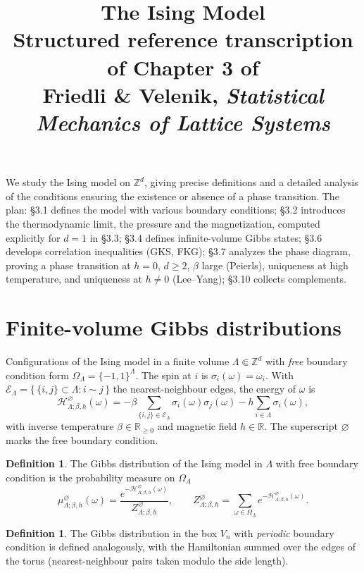 \documentclass[11pt]{article}
\title{\textbf{The Ising Model}\\[4pt]
\large Structured reference transcription of Chapter 3 of\\
Friedli \& Velenik, \emph{Statistical Mechanics of Lattice Systems}}
\author{}
\date{}
\theoremstyle{plain}
\theoremstyle{definition}
\newtheorem{definition}[theorem]{Definition}
\theoremstyle{remark}
\newcommand{\Z}{\mathbb{Z}}
\newcommand{\R}{\mathbb{R}}
\newcommand{\Rgeq}{\R_{\ge 0}}
\newcommand{\fin}{\Subset}          %
\newcommand{\La}{\Lambda}
\newcommand{\sg}{\sigma}
\newcommand{\Ham}{\mathcal{H}}
\newcommand{\Eset}{\mathscr{E}}
\begin{document}
\maketitle

\noindent
We study the Ising model on $\Z^d$, giving precise definitions and a detailed
analysis of the conditions ensuring the existence or absence of a phase
transition. The plan: \S3.1 defines the model with various boundary conditions;
\S3.2 introduces the thermodynamic limit, the pressure and the magnetization,
computed explicitly for $d=1$ in \S3.3; \S3.4 defines infinite-volume Gibbs
states; \S3.6 develops correlation inequalities (GKS, FKG); \S3.7 analyzes the
phase diagram, proving a phase transition at $h=0$, $d\ge 2$, $\beta$ large
(Peierls), uniqueness at high temperature, and uniqueness at $h\neq0$
(Lee--Yang); \S3.10 collects complements.

\section{Finite-volume Gibbs distributions}
Configurations of the Ising model in a finite volume $\La \fin \Z^d$ with
\emph{free} boundary condition form $\Omega_\La = \{-1,1\}^\La$. The spin at
$i$ is $\sg_i(\omega)=\omega_i$. With $\Eset_\La = \{\,\{i,j\}\subset\La : i\sim
j\,\}$ the nearest-neighbour edges, the energy of $\omega$ is
\[
  \Ham^{\varnothing}_{\La;\beta,h}(\omega)
    = -\beta \sum_{\{i,j\}\in\Eset_\La} \sg_i(\omega)\sg_j(\omega)
      - h \sum_{i\in\La} \sg_i(\omega),
\]
with inverse temperature $\beta\in\Rgeq$ and magnetic field $h\in\R$. The
superscript $\varnothing$ marks the free boundary condition.

\begin{definition}
The Gibbs distribution of the Ising model in $\La$ with free boundary condition
is the probability measure on $\Omega_\La$
\[
  \mu^{\varnothing}_{\La;\beta,h}(\omega)
    = \frac{e^{-\Ham^{\varnothing}_{\La;\beta,h}(\omega)}}
           {Z^{\varnothing}_{\La;\beta,h}},
  \qquad
  Z^{\varnothing}_{\La;\beta,h}
    = \sum_{\omega\in\Omega_\La} e^{-\Ham^{\varnothing}_{\La;\beta,h}(\omega)} .
\]
\end{definition}

\begin{definition}
The Gibbs distribution in the box $V_n$ with \emph{periodic} boundary condition
is defined analogously, with the Hamiltonian summed over the edges of the torus
(nearest-neighbour pairs taken modulo the side length).
\end{definition}
\end{document}
